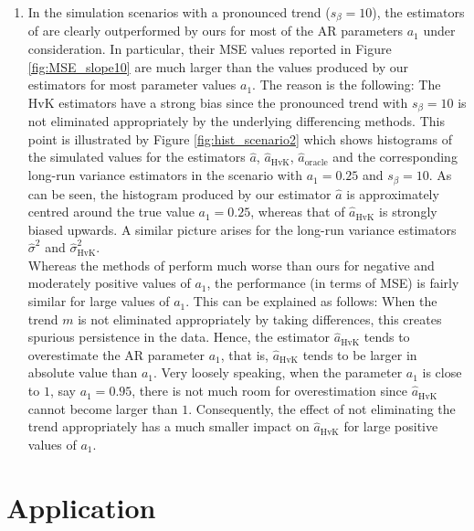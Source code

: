 \begin{enumerate}[label=(\alph*),leftmargin=0.7cm]
\item In the simulation scenarios with a pronounced trend ($s_\beta = 10$), the estimators of \cite{Hall2003} are clearly outperformed by ours for most of the AR parameters $a_1$ under consideration. In particular, their MSE values reported in Figure \ref{fig:MSE_slope10} are much larger than the values produced by our estimators for most parameter values $a_1$. The reason is the following: The HvK estimators have a strong bias since the pronounced trend with $s_\beta = 10$ is not eliminated appropriately by the underlying differencing methods. This point is illustrated by Figure \ref{fig:hist_scenario2} which shows histograms of the simulated values for the estimators $\widehat{a}$, $\widehat{a}_{\text{HvK}}$, $\widehat{a}_{\text{oracle}}$ and the corresponding long-run variance estimators in the scenario with $a_1=0.25$ and $s_\beta = 10$. As can be seen, the histogram produced by our estimator $\widehat{a}$ is approximately centred around the true value $a_1 = 0.25$, whereas that of $\widehat{a}_{\text{HvK}}$ is strongly biased upwards. A similar picture arises for the long-run variance estimators $\widehat{\sigma}^2$ and $\widehat{\sigma}^2_{\text{HvK}}$. \\
Whereas the methods of \cite{Hall2003} perform much worse than ours for negative and moderately positive values of $a_1$, the performance (in terms of MSE) is fairly similar for large values of $a_1$. This can be explained as follows: When the trend $m$ is not eliminated appropriately by taking differences, this creates spurious persistence in the data. Hence, the estimator $\widehat{a}_{\text{HvK}}$ tends to overestimate the AR parameter $a_1$, that is, $\widehat{a}_{\text{HvK}}$ tends to be larger in absolute value than $a_1$. Very loosely speaking, when the parameter $a_1$ is close to $1$, say $a_1 = 0.95$, there is not much room for overestimation since $\widehat{a}_{\text{HvK}}$ cannot become larger than $1$. Consequently, the effect of not eliminating the trend appropriately has a much smaller impact on $\widehat{a}_{\text{HvK}}$ for large positive values of $a_1$. 

\end{enumerate}



\vspace{-0.5cm}

\enlargethispage{0.25cm}
\section{Application}\label{sec-data}



